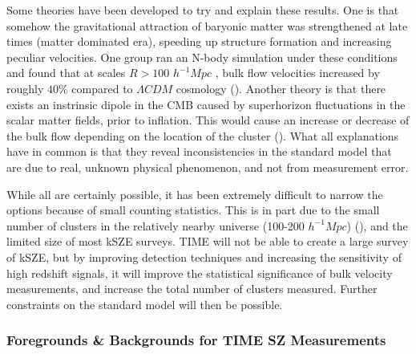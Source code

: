 \documentclass[manuscript]{aastex}
\begin{document}
Some theories have been developed to try and explain these results. One is that somehow the gravitational attraction of baryonic matter was strengthened at late times (matter dominated era), speeding up structure formation and increasing peculiar velocities. One group ran an N-body simulation under these conditions and found that at scales  \(R > 100\) \(h^{-1} Mpc\) , bulk flow velocities increased by roughly \(40\%\) compared to \(\Lambda CDM\) cosmology (\cite{Wyman2010}). Another theory is that there exists an instrinsic dipole in the CMB caused by superhorizon fluctuations in the scalar matter fields, prior to inflation. This would cause an increase or decrease of the bulk flow depending on the location of the cluster (\cite{Mak2011}).  What all explanations have in common is that they reveal inconsistencies in the standard model that are due to real, unknown physical phenomenon, and not from measurement error. 

While all are certainly possible, it has been extremely difficult to narrow the options because of small counting statistics. This is in part due to the small number of clusters in the relatively nearby universe (100-200 \(h^{-1} Mpc\)) (\cite{Lavaux2013}), and the limited size of most kSZE surveys. TIME will not be able to create a large survey of kSZE, but by improving detection techniques and increasing the sensitivity of high redshift signals, it will improve the statistical significance of bulk velocity measurements, and increase the total number of clusters measured. Further constraints on the standard model will then be possible.  

\subsubsection{Foregrounds \& Backgrounds for TIME SZ Measurements}
\end{document}
